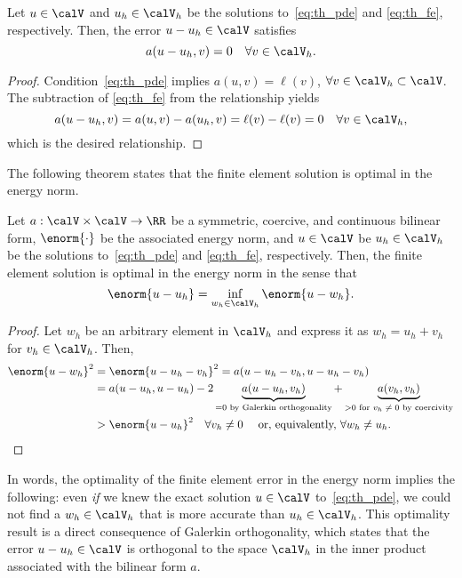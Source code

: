 \begin{lemma}
  Let $u \in \calV$ and $u_h \in \calV_h$ be the solutions to~\eqref{eq:th_pde} and \eqref{eq:th_fe}, respectively.  Then, the error $u - u_h \in \calV$ satisfies 
  \begin{equation*}
    a(u - u_h, v) = 0 \quad \forall v \in \calV_h.
  \end{equation*}
  \begin{proof}
    Condition~\eqref{eq:th_pde} implies $a(u,v) = \ell(v)$, $\forall v \in \calV_h \subset \calV$.  The subtraction of \eqref{eq:th_fe} from the relationship yields
    \begin{equation*}
      a(u - u_h, v) = a(u,v) - a(u_h,v) = \ell(v) - \ell(v) = 0 \quad \forall v \in \calV_h,
    \end{equation*}
    which is the desired relationship.
  \end{proof}
\end{lemma}

The following theorem states that the finite element solution is optimal in the energy norm.
\begin{theorem}
  Let $a: \calV \times \calV \to \RR$ be a symmetric, coercive, and continuous bilinear form, $\enorm{\cdot}$ be the associated energy norm, and $u \in \calV$ be $u_h \in \calV_h$ be the solutions to~\eqref{eq:th_pde} and \eqref{eq:th_fe}, respectively. Then, the finite element solution is optimal in the energy norm in the sense that
  \begin{equation*}
   \enorm{ u - u_h } = \inf_{w_h \in \calV_h} \enorm{ u - w_h }.
  \end{equation*}
  \begin{proof}
    Let $w_h$ be an arbitrary element in $\calV_h$ and express it as $w_h = u_h + v_h$ for $v_h \in \calV_h$.  Then,
\begin{align*}
  \enorm{u - w_h}^2 &= \enorm{u - u_h - v_h}^2
  = a(u - u_h - v_h, u - u_h - v_h) \\
  &= a(u - u_h, u - u_h) - 2 \underbrace{ a(u - u_h, v_h) }_{= 0 \text{ by Galerkin orthogonality}} + \underbrace{ a(v_h,v_h) }_{> 0 \text{ for $v_h \neq 0$ by coercivity}}
  \\
  &> \enorm{u - u_h}^2 \quad \forall v_h \neq 0 \quad \text{ or, equivalently, $\forall w_h \neq u_h$}.
\end{align*}
  \end{proof}
\end{theorem}
In words, the optimality of the finite element error in the energy norm implies the following: even \emph{if} we knew the exact solution $u \in \calV$ to~\eqref{eq:th_pde}, we could not find a $w_h \in \calV_h$ that is more accurate than $u_h \in \calV_h$. This optimality result is a direct consequence of Galerkin orthogonality, which states that the error $u - u_h \in \calV$ is orthogonal to the space $\calV_h$ in the inner product associated with the bilinear form $a$.

